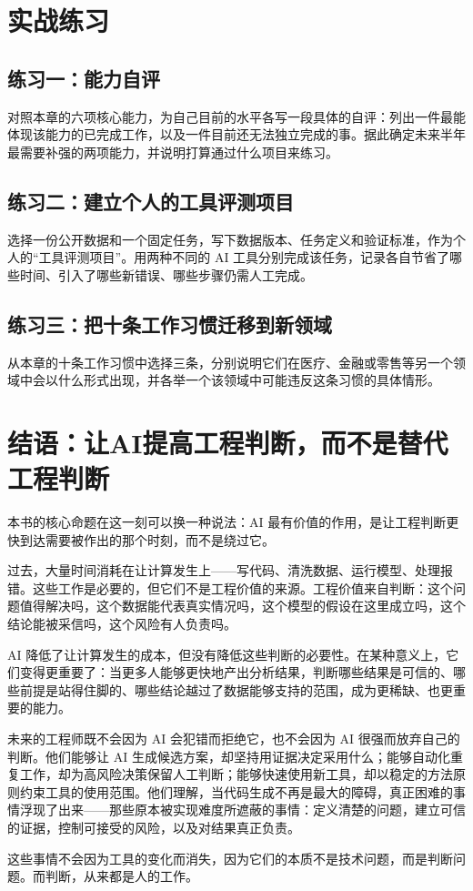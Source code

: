 \section{实战练习}

\subsection*{练习一：能力自评}

对照本章的六项核心能力，为自己目前的水平各写一段具体的自评：列出一件最能体现该能力的已完成工作，以及一件目前还无法独立完成的事。据此确定未来半年最需要补强的两项能力，并说明打算通过什么项目来练习。

\subsection*{练习二：建立个人的工具评测项目}

选择一份公开数据和一个固定任务，写下数据版本、任务定义和验证标准，作为个人的“工具评测项目”。用两种不同的 AI 工具分别完成该任务，记录各自节省了哪些时间、引入了哪些新错误、哪些步骤仍需人工完成。

\subsection*{练习三：把十条工作习惯迁移到新领域}

从本章的十条工作习惯中选择三条，分别说明它们在医疗、金融或零售等另一个领域中会以什么形式出现，并各举一个该领域中可能违反这条习惯的具体情形。

\section{结语：让AI提高工程判断，而不是替代工程判断}

本书的核心命题在这一刻可以换一种说法：AI 最有价值的作用，是让工程判断更快到达需要被作出的那个时刻，而不是绕过它。

过去，大量时间消耗在让计算发生上——写代码、清洗数据、运行模型、处理报错。这些工作是必要的，但它们不是工程价值的来源。工程价值来自判断：这个问题值得解决吗，这个数据能代表真实情况吗，这个模型的假设在这里成立吗，这个结论能被采信吗，这个风险有人负责吗。

AI 降低了让计算发生的成本，但没有降低这些判断的必要性。在某种意义上，它们变得更重要了：当更多人能够更快地产出分析结果，判断哪些结果是可信的、哪些前提是站得住脚的、哪些结论越过了数据能够支持的范围，成为更稀缺、也更重要的能力。

未来的工程师既不会因为 AI 会犯错而拒绝它，也不会因为 AI 很强而放弃自己的判断。他们能够让 AI 生成候选方案，却坚持用证据决定采用什么；能够自动化重复工作，却为高风险决策保留人工判断；能够快速使用新工具，却以稳定的方法原则约束工具的使用范围。他们理解，当代码生成不再是最大的障碍，真正困难的事情浮现了出来——那些原本被实现难度所遮蔽的事情：定义清楚的问题，建立可信的证据，控制可接受的风险，以及对结果真正负责。

这些事情不会因为工具的变化而消失，因为它们的本质不是技术问题，而是判断问题。而判断，从来都是人的工作。
